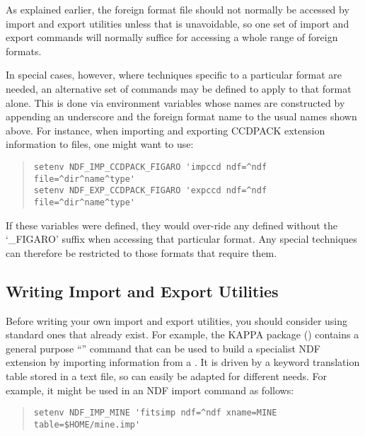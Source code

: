 As explained earlier, the foreign format file should not normally be
accessed by import and export utilities unless that is unavoidable, so
one set of import and export commands will normally suffice for
accessing a whole range of foreign formats.

In special cases, however, where techniques specific to a particular
format are needed, an alternative set of commands may be defined to
apply to that format alone.  This is done via environment variables
whose names are constructed by appending an underscore and the foreign
format name to the usual names shown above. For instance, when
importing and exporting CCDPACK extension information to
 files, one might want to use:

\begin{quote}
\begin{small}
\begin{verbatim}
setenv NDF_IMP_CCDPACK_FIGARO 'impccd ndf=^ndf file=^dir^name^type'
setenv NDF_EXP_CCDPACK_FIGARO 'expccd ndf=^ndf file=^dir^name^type'
\end{verbatim}
\end{small}
\end{quote}

If these variables were defined, they would over-ride any defined
without the `\_FIGARO' suffix when accessing that particular format.
Any special techniques can therefore be restricted to those formats
that require them.

\subsection{Writing Import and Export Utilities}

Before writing your own import and export utilities, you should
consider using standard ones that already exist. For example, the
KAPPA package () contains a general purpose
``'' command that can be used to build a
specialist NDF extension by importing information from a . It is driven by a keyword translation
table stored in a text file, so can easily be adapted for different
needs.  For example, it might be used in an NDF import command as
follows:

\begin{quote}
\begin{small}
\begin{verbatim}
setenv NDF_IMP_MINE 'fitsimp ndf=^ndf xname=MINE table=$HOME/mine.imp'
\end{verbatim}
\end{small}
\end{quote}

